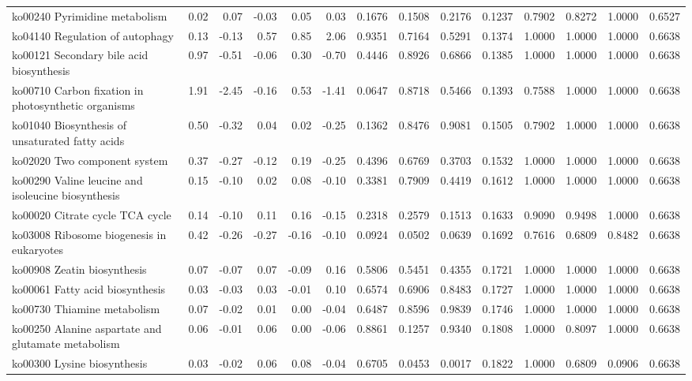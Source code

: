 {\begin{landscape}
\begin{longtable}{ | l | r | r | r | r | r | r  | r | r | r | r | r | r  | r  |}
			ko00240  Pyrimidine metabolism & 0.02 & 0.07 & -0.03 & 0.05 & 0.03 & 0.1676 & 0.1508 & 0.2176 & 0.1237 & 0.7902 & 0.8272 & 1.0000 & 0.6527 \\ 
			ko04140  Regulation of autophagy & 0.13 & -0.13 & 0.57 & 0.85 & 2.06 & 0.9351 & 0.7164 & 0.5291 & 0.1374 & 1.0000 & 1.0000 & 1.0000 & 0.6638 \\ 
			ko00121  Secondary bile acid biosynthesis & 0.97 & -0.51 & -0.06 & 0.30 & -0.70 & 0.4446 & 0.8926 & 0.6866 & 0.1385 & 1.0000 & 1.0000 & 1.0000 & 0.6638 \\ 
			ko00710  Carbon fixation in photosynthetic organisms & 1.91 & -2.45 & -0.16 & 0.53 & -1.41 & 0.0647 & 0.8718 & 0.5466 & 0.1393 & 0.7588 & 1.0000 & 1.0000 & 0.6638 \\ 
			ko01040  Biosynthesis of unsaturated fatty acids & 0.50 & -0.32 & 0.04 & 0.02 & -0.25 & 0.1362 & 0.8476 & 0.9081 & 0.1505 & 0.7902 & 1.0000 & 1.0000 & 0.6638 \\ 
			ko02020  Two component system & 0.37 & -0.27 & -0.12 & 0.19 & -0.25 & 0.4396 & 0.6769 & 0.3703 & 0.1532 & 1.0000 & 1.0000 & 1.0000 & 0.6638 \\ 
			ko00290  Valine leucine and isoleucine biosynthesis & 0.15 & -0.10 & 0.02 & 0.08 & -0.10 & 0.3381 & 0.7909 & 0.4419 & 0.1612 & 1.0000 & 1.0000 & 1.0000 & 0.6638 \\ 
			ko00020  Citrate cycle TCA cycle  & 0.14 & -0.10 & 0.11 & 0.16 & -0.15 & 0.2318 & 0.2579 & 0.1513 & 0.1633 & 0.9090 & 0.9498 & 1.0000 & 0.6638 \\ 
			ko03008  Ribosome biogenesis in eukaryotes & 0.42 & -0.26 & -0.27 & -0.16 & -0.10 & 0.0924 & 0.0502 & 0.0639 & 0.1692 & 0.7616 & 0.6809 & 0.8482 & 0.6638 \\ 
			ko00908  Zeatin biosynthesis & 0.07 & -0.07 & 0.07 & -0.09 & 0.16 & 0.5806 & 0.5451 & 0.4355 & 0.1721 & 1.0000 & 1.0000 & 1.0000 & 0.6638 \\ 
			ko00061  Fatty acid biosynthesis & 0.03 & -0.03 & 0.03 & -0.01 & 0.10 & 0.6574 & 0.6906 & 0.8483 & 0.1727 & 1.0000 & 1.0000 & 1.0000 & 0.6638 \\ 
			ko00730  Thiamine metabolism & 0.07 & -0.02 & 0.01 & 0.00 & -0.04 & 0.6487 & 0.8596 & 0.9839 & 0.1746 & 1.0000 & 1.0000 & 1.0000 & 0.6638 \\ 
			ko00250  Alanine aspartate and glutamate metabolism & 0.06 & -0.01 & 0.06 & 0.00 & -0.06 & 0.8861 & 0.1257 & 0.9340 & 0.1808 & 1.0000 & 0.8097 & 1.0000 & 0.6638 \\ 
			ko00300  Lysine biosynthesis & 0.03 & -0.02 & 0.06 & 0.08 & -0.04 & 0.6705 & 0.0453 & 0.0017 & 0.1822 & 1.0000 & 0.6809 & 0.0906 & 0.6638 \\ 

\end{longtable}
\end{landscape}}

